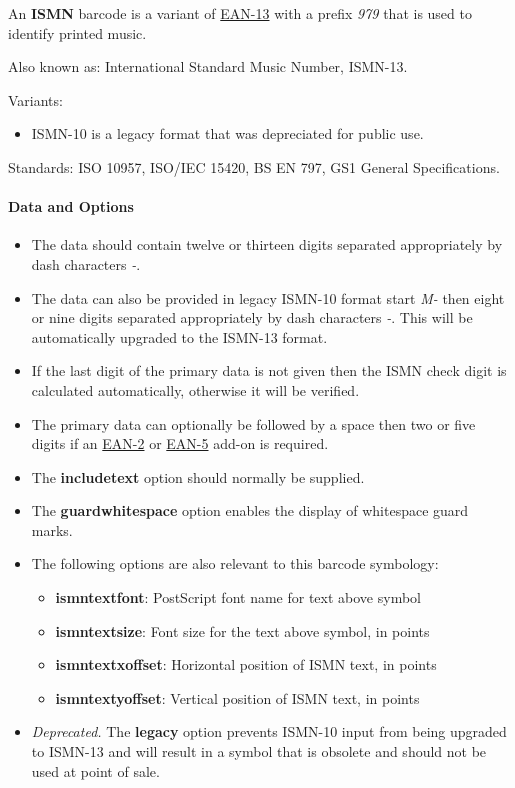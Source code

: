An \textbf{ISMN} barcode is a variant of
\protect\hyperlink{ean-13}{EAN-13} with a prefix \emph{979} that is used
to identify printed music.

Also known as: International Standard Music Number, ISMN-13.

Variants:

\begin{itemize}
\tightlist
\item
  ISMN-10 is a legacy format that was depreciated for public use.
\end{itemize}

Standards: ISO 10957, ISO/IEC 15420, BS EN 797, GS1 General
Specifications.

\hypertarget{data-and-options-5}{%
\paragraph{Data and Options}\label{data-and-options-5}}

\begin{itemize}
\tightlist
\item
  The data should contain twelve or thirteen digits separated
  appropriately by dash characters \emph{-}.
\item
  The data can also be provided in legacy ISMN-10 format start \emph{M-}
  then eight or nine digits separated appropriately by dash characters
  \emph{-}. This will be automatically upgraded to the ISMN-13 format.
\item
  If the last digit of the primary data is not given then the ISMN check
  digit is calculated automatically, otherwise it will be verified.
\item
  The primary data can optionally be followed by a space then two or
  five digits if an \protect\hyperlink{ean-2}{EAN-2} or
  \protect\hyperlink{ean-5}{EAN-5} add-on is required.
\item
  The \textbf{includetext} option should normally be supplied.
\item
  The \textbf{guardwhitespace} option enables the display of whitespace
  guard marks.
\item
  The following options are also relevant to this barcode symbology:

  \begin{itemize}
  \tightlist
  \item
    \textbf{ismntextfont}: PostScript font name for text above symbol
  \item
    \textbf{ismntextsize}: Font size for the text above symbol, in
    points
  \item
    \textbf{ismntextxoffset}: Horizontal position of ISMN text, in
    points
  \item
    \textbf{ismntextyoffset}: Vertical position of ISMN text, in points
  \end{itemize}
\item
  \emph{Deprecated.} The \textbf{legacy} option prevents ISMN-10 input
  from being upgraded to ISMN-13 and will result in a symbol that is
  obsolete and should not be used at point of sale.
\end{itemize}

